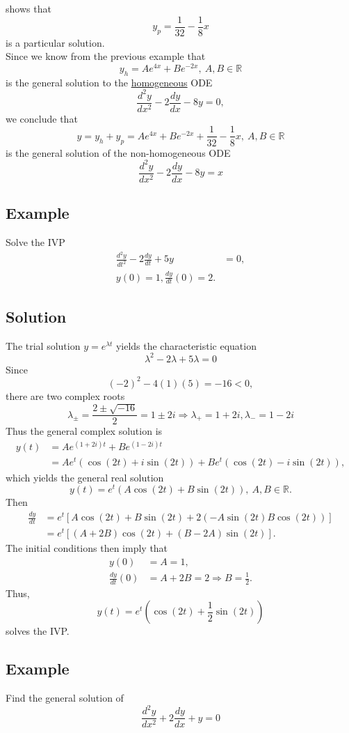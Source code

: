 \documentclass[11pt]{article}
\newcommand{\reals}{\mathbb{R}}
\begin{document}
shows that 
\[ y_p = \frac{1}{32} - \frac{1}{8}x \]
is a particular solution.\\
Since we know from the previous example that
\[ y_h = Ae^{4x} + Be^{-2x},\ A, B \in \reals \]
is the general solution to the \underline{homogeneous} ODE
\[ \frac{d^2 y}{dx^2} - 2\frac{dy}{dx} - 8y = 0, \]
we conclude that 
\[ y = y_h + y_p = Ae^{4x} + Be^{-2x} + \frac{1}{32} - \frac{1}{8}x,\ A, B \in \reals \]
is the general solution of the non-homogeneous ODE
\[ \frac{d^2 y}{dx^2} - 2\frac{dy}{dx} - 8y = x \]

\subsection{Example}
Solve the IVP
\begin{align*}
\frac{d^2 y}{dt^2} - 2\frac{dy}{dt} + 5y &= 0, \\
y(0) = 1, \frac{dy}{dt}(0) = 2.
\end{align*}

\subsection*{Solution}
The trial solution $y = e^{\lambda t}$ yields the characteristic equation
\[ \lambda^2 - 2\lambda + 5\lambda = 0 \]
Since
\[ (-2)^2 - 4(1)(5) = -16 < 0, \]
there are two complex roots
\[ \lambda_\pm = \frac{2 \pm \sqrt{-16}}{2} = 1 \pm 2i \Rightarrow \lambda_+ = 1 + 2i, \lambda_- = 1 - 2i \]
Thus the general complex solution is
\begin{align*}
y(t) &= Ae^{(1 + 2i)t} + Be^{(1 - 2i)t} \\
&= Ae^t (\cos(2t) + i\sin(2t)) + Be^t (\cos(2t) - i \sin(2t)),
\end{align*}
which yields the general real solution
\[ y(t) = e^t (A \cos(2t) + B \sin(2t)),\ A, B \in \reals. \]
Then
\begin{align*}
\frac{dy}{dt} &= e^t \left[ A \cos(2t) + B \sin(2t) + 2(-A \sin(2t) B \cos(2t)) \right] \\
&= e^t \left[ (A + 2B) \cos(2t) + (B - 2A)\sin(2t) \right].
\end{align*}
The initial conditions then imply that
\begin{align*}
y(0) &= A = 1, \\
\frac{dy}{dt}(0) &= A + 2B = 2 \Rightarrow B = \frac{1}{2}.
\end{align*}
Thus,
\[ y(t) = e^t(\cos(2t) + \frac{1}{2}\sin(2t)) \]
solves the IVP.

\subsection{Example}
Find the general solution of
\[ \frac{d^2 y}{dx^2} + 2 \frac{dy}{dx} + y = 0 \]
\end{document}
